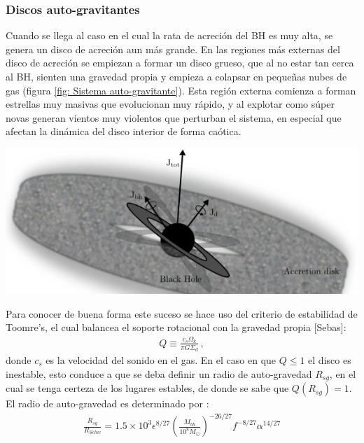    \subsubsection{Discos auto-gravitantes}
    \label{subsubsec: Disco auto-gravitantes}
Cuando se llega al caso en el cual la rata de acreción del BH es muy alta, se genera un disco de acreción aun más grande. En las regiones más externas del disco de acreción se empiezan a formar un disco grueso, que al no estar tan cerca al BH, sienten una gravedad propia y empieza a colapsar en pequeñas nubes de gas (figura \ref{fig: Sistema auto-gravitante}). Esta región externa comienza a forman estrellas muy masivas que evolucionan muy rápido, y al explotar como súper novas generan vientos muy violentos que perturban el sistema, en especial que afectan la dinámica del disco interior de forma caótica. 
%
\begin{center}
\includegraphics[scale=.3]{./figures/4_Modelo_Spin/Sistema_auto-gravitante.png}
\label{fig: Sistema auto-gravitante}
\end{center}
%
Para conocer de buena forma este suceso se hace uso del criterio de estabilidad de Toomre's, el cual balancea  el soporte rotacional con la gravedad propia [Sebas]:
%
\begin{align}
    Q\equiv\frac{c_{s}\Omega_{k}}{\pi G\Sigma_{d}}\,,
    \label{eq: estabilidad_Toomre's}
\end{align}
%
donde $c_{s}$ es la velocidad del sonido en el gas. En el caso en que $Q\leq 1$ el disco es inestable, esto conduce a que se deba definir un radio de auto-gravedad $R_{sg}$, en el cual se tenga certeza de los lugares estables, de donde se sabe que $Q(R_{sg})=1$. El radio de auto-gravedad es determinado por \cite{fanidakis2011}:
%
\begin{align}
    \frac{R_{sg}}{R_{Schw}}=1.5\times 10^{3}\epsilon^{8/27}\left(\frac{M_{bh}}{10^{8}M_{\odot}} \right)^{-26/27}f^{-8/27}\alpha^{14/27}
\end{align}
